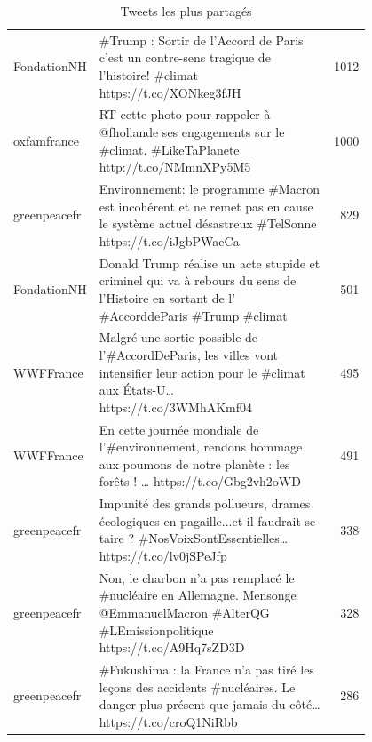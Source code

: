             \begin{landscape}
                \begin{table}
                \caption{Tweets les plus partagés}
                \label{table:23toptweets}
                    \centering
                    \scriptsize
                    \begin{tabularx}{\linewidth}{|L|K{0.8\linewidth}|R|}
                    \hline
                    	&		&		\\ \hline

                        FondationNH	&	\#Trump : Sortir de l'Accord de Paris c'est un contre-sens tragique de l'histoire!  \#climat https://t.co/XONkeg3fJH	&	1012	\\ \hline
                        oxfamfrance	&	RT cette photo pour rappeler à @fhollande ses engagements sur le \#climat. \#LikeTaPlanete http://t.co/NMmnXPy5M5	&	1000	\\ \hline
                        greenpeacefr	&	Environnement: le programme \#Macron est incohérent et ne remet pas en cause le système actuel désastreux \#TelSonne https://t.co/iJgbPWaeCa	&	829	\\ \hline
                        FondationNH	&	Donald Trump réalise un acte stupide et criminel qui va à rebours du sens de l’Histoire en sortant de l' \#AccorddeParis  \#Trump \#climat	&	501	\\ \hline
                        WWFFrance	&	Malgré une sortie possible de l’\#AccordDeParis, les villes vont intensifier leur action pour le \#climat aux États-U… https://t.co/3WMhAKmf04	&	495	\\ \hline
                        WWFFrance	&	En cette journée mondiale de l'\#environnement, rendons hommage aux poumons de notre planète : les forêts ! ️… https://t.co/Gbg2vh2oWD	&	491	\\ \hline
                        greenpeacefr	&	Impunité des grands pollueurs, drames écologiques en pagaille...et il faudrait se taire ? \#NosVoixSontEssentielles… https://t.co/lv0jSPeJfp	&	338	\\ \hline
                        greenpeacefr	&	Non, le charbon n’a pas remplacé le \#nucléaire en Allemagne. Mensonge @EmmanuelMacron \#AlterQG \#LEmissionpolitique https://t.co/A9Hq7sZD3D	&	328	\\ \hline
                        greenpeacefr	&	\#Fukushima : la France n’a pas tiré les leçons des accidents \#nucléaires. Le danger plus présent que jamais du côté… https://t.co/croQ1NiRbb	&	286	\\ \hline

\end{tabularx}
\end{table}
\end{landscape}

